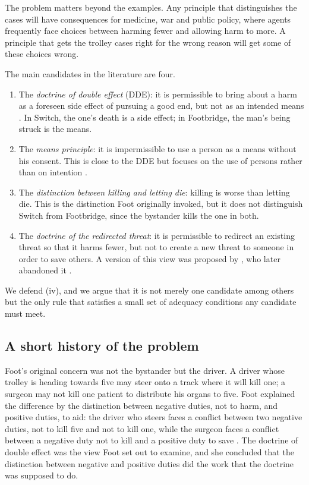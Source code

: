 \documentclass{situationist-preprint}
\begin{document}
The problem matters beyond the examples. Any principle that distinguishes the cases will have consequences for medicine, war and public policy, where agents frequently face choices between harming fewer and allowing harm to more. A principle that gets the trolley cases right for the wrong reason will get some of these choices wrong.

The main candidates in the literature are four.
\begin{enumerate}[label=(\roman*)]
\item The \emph{doctrine of double effect} (DDE): it is permissible to bring about a harm as a foreseen side effect of pursuing a good end, but not as an intended means \citep{Foot1967}. In Switch, the one's death is a side effect; in Footbridge, the man's being struck is the means.
\item The \emph{means principle}: it is impermissible to use a person as a means without his consent. This is close to the DDE but focuses on the use of persons rather than on intention \citep{Kamm2007}.
\item The \emph{distinction between killing and letting die}: killing is worse than letting die. This is the distinction Foot originally invoked, but it does not distinguish Switch from Footbridge, since the bystander kills the one in both.
\item The \emph{doctrine of the redirected threat}: it is permissible to redirect an existing threat so that it harms fewer, but not to create a new threat to someone in order to save others. A version of this view was proposed by \citet{Thomson1985}, who later abandoned it \citep{Thomson2008}.
\end{enumerate}

We defend (iv), and we argue that it is not merely one candidate among others but the only rule that satisfies a small set of adequacy conditions any candidate must meet.

\subsection{A short history of the problem}

Foot's original concern was not the bystander but the driver. A driver whose trolley is heading towards five may steer onto a track where it will kill one; a surgeon may not kill one patient to distribute his organs to five. Foot explained the difference by the distinction between negative duties, not to harm, and positive duties, to aid: the driver who steers faces a conflict between two negative duties, not to kill five and not to kill one, while the surgeon faces a conflict between a negative duty not to kill and a positive duty to save \citep{Foot1967}. The doctrine of double effect was the view Foot set out to examine, and she concluded that the distinction between negative and positive duties did the work that the doctrine was supposed to do.
\end{document}
